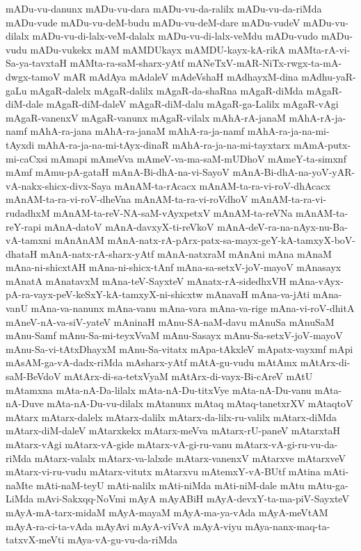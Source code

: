 {mADu-vu-danunx
mADu-vu-dara
mADu-vu-da-ralilx
mADu-vu-da-riMda
mADu-vude
mADu-vu-deM-budu
mADu-vu-deM-dare
mADu-vudeV
mADu-vu-dilalx
mADu-vu-di-lalx-veM-dalalx
mADu-vu-di-lalx-veMdu
mADu-vudo
mADu-vudu
mADu-vukekx
mAM
mAMDUkayx
mAMDU-kayx-kA-rikA
mAMta-rA-vi-Sa-ya-tavxtaH
mAMta-ra-saM-sharx-yAtf
mANeTxV-mAR-NiTx-rwgx-ta-mA-dwgx-tamoV
mAR
mAdAya
mAdaleV
mAdeVshaH
mAdhayxM-dina
mAdhu-yaR-gaLu
mAgaR-dalelx
mAgaR-dalilx
mAgaR-da-shaRna
mAgaR-diMda
mAgaR-diM-dale
mAgaR-diM-daleV
mAgaR-diM-dalu
mAgaR-ga-Lalilx
mAgaR-vAgi
mAgaR-vanenxV
mAgaR-vanunx
mAgaR-vilalx
mAhA-rA-janaM
mAhA-rA-ja-namf
mAhA-ra-jana
mAhA-ra-janaM
mAhA-ra-ja-namf
mAhA-ra-ja-na-mi-tAyxdi
mAhA-ra-ja-na-mi-tAyx-dinaR
mAhA-ra-ja-na-mi-tayxtarx
mAmA-putx-mi-caCxsi
mAmapi
mAmeVva
mAmeV-va-ma-saM-mUDhoV
mAmeY-ta-simxnf
mAmf
mAmu-pA-gataH
mAnA-Bi-dhA-na-vi-SayoV
mAnA-Bi-dhA-na-yoV-yAR-vA-nakx-shicx-divx-Saya
mAnAM-ta-rAcacx
mAnAM-ta-ra-vi-roV-dhAcacx
mAnAM-ta-ra-vi-roV-dheVna
mAnAM-ta-ra-vi-roVdhoV
mAnAM-ta-ra-vi-rudadhxM
mAnAM-ta-reV-NA-saM-vAyxpetxV
mAnAM-ta-reVNa
mAnAM-ta-reY-rapi
mAnA-datoV
mAnA-davxyX-ti-reVkoV
mAnA-deV-ra-na-nAyx-nu-Ba-vA-tamxni
mAnAnAM
mAnA-natx-rA-pArx-patx-sa-mayx-geY-kA-tamxyX-boV-dhataH
mAnA-natx-rA-sharx-yAtf
mAnA-natxraM
mAnAni
mAna
mAnaM
mAna-ni-shicxtAH
mAna-ni-shicx-tAnf
mAna-sa-setxV-joV-mayoV
mAnasayx
mAnatA
mAnatavxM
mAna-teV-SayxteV
mAnatx-rA-sidedhxVH
mAna-vAyx-pA-ra-vayx-peV-keSxY-kA-tamxyX-ni-shicxtw
mAnavaH
mAna-va-jAti
mAna-vanU
mAna-va-nanunx
mAna-vanu
mAna-vara
mAna-va-rige
mAna-vi-roV-dhitA
mAneV-nA-va-siV-yateV
mAninaH
mAnu-SA-naM-davu
mAnuSa
mAnuSaM
mAnu-Samf
mAnu-Sa-mi-teyxVvaM
mAnu-Sasayx
mAnu-Sa-setxV-joV-mayoV
mAnu-Sa-vi-tAtxDhayxM
mAnu-Sa-vitatx
mApa-tAkxleV
mApatx-vayxmf
mApi
mAsAM-ga-vA-dadx-riMda
mAsharx-yAtf
mAtA-gu-vudu
mAtAmx
mAtArx-di-saM-BeVdoV
mAtArx-di-sa-tetxVyaM
mAtArx-di-vayx-Bi-cAreV
mAtU
mAtamxna
mAta-nA-Da-lilalx
mAta-nA-Du-titxVye
mAta-nA-Du-vanu
mAta-nA-Duve
mAta-nA-Du-vu-dilalx
mAtanunx
mAtaq
mAtaq-tanetxrXV
mAtaqtoV
mAtarx
mAtarx-dalelx
mAtarx-dalilx
mAtarx-da-lilx-ru-valilx
mAtarx-diMda
mAtarx-diM-daleV
mAtarxkekx
mAtarx-meVva
mAtarx-rU-paneV
mAtarxtaH
mAtarx-vAgi
mAtarx-vA-gide
mAtarx-vA-gi-ru-vanu
mAtarx-vA-gi-ru-vu-da-riMda
mAtarx-valalx
mAtarx-va-lalxde
mAtarx-vanenxV
mAtarxve
mAtarxveV
mAtarx-vi-ru-vudu
mAtarx-vitutx
mAtarxvu
mAtemxY-vA-BUtf
mAtina
mAti-naMte
mAti-naM-teyU
mAti-nalilx
mAti-niMda
mAti-niM-dale
mAtu
mAtu-ga-LiMda
mAvi-Sakxqq-NoVmi
mAyA
mAyABiH
mAyA-devxY-ta-ma-piV-SayxteV
mAyA-mA-tarx-midaM
mAyA-mayaM
mAyA-ma-ya-vAda
mAyA-meVtAM
mAyA-ra-ci-ta-vAda
mAyAvi
mAyA-viVvA
mAyA-viyu
mAya-nanx-maq-ta-tatxvX-meVti
mAya-vA-gu-vu-da-riMda
}
